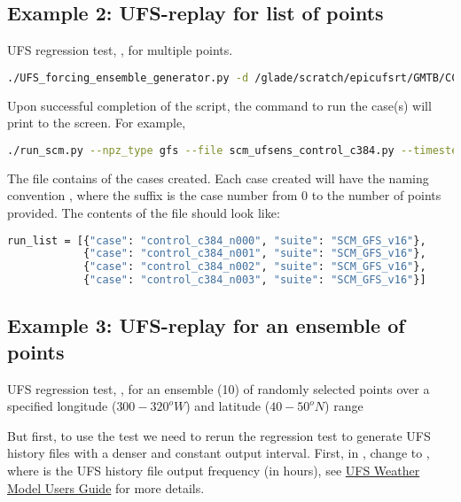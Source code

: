 \subsection{Example 2: UFS-replay for list of points}
\label{subsection: example2}

UFS regression test, , for multiple points.
\begin{lstlisting}[language=bash]
./UFS_forcing_ensemble_generator.py -d /glade/scratch/epicufsrt/GMTB/CCPP-SCM/UFS_RTs/control_c384/ -sc --C_RES 384 -dt 225 -n control_c384 -lons 300 300 300 300 -lats 34 35 35 37
\end{lstlisting}

Upon successful completion of the script, the command to run the case(s) will print to the screen. For example,

\begin{lstlisting}[language=bash]
./run_scm.py --npz_type gfs --file scm_ufsens_control_c384.py --timestep 225
\end{lstlisting}

The file  contains  of the cases created. Each case created will have the naming convention , where the suffix  is the case number from 0 to the number of points provided. The contents of the file should look like:
\begin{lstlisting}[language=bash]
run_list = [{"case": "control_c384_n000", "suite": "SCM_GFS_v16"},
            {"case": "control_c384_n001", "suite": "SCM_GFS_v16"},
            {"case": "control_c384_n002", "suite": "SCM_GFS_v16"},
            {"case": "control_c384_n003", "suite": "SCM_GFS_v16"}]
\end{lstlisting}

\subsection{Example 3: UFS-replay for an ensemble of points}
\label{subsection: example3}

UFS regression test, , for an ensemble (10) of randomly selected points over a specified longitude ($300-320^oW$) and latitude ($40-50^oN$) range

But first, to use the  test we need to rerun the regression test to generate UFS history files with a denser and constant output interval. First, in , change  to , where  is the UFS history file output frequency (in hours), see \href{https://ufs-weather-model.readthedocs.io/en/latest/InputsOutputs.html}{UFS Weather Model Users Guide} for more details.

